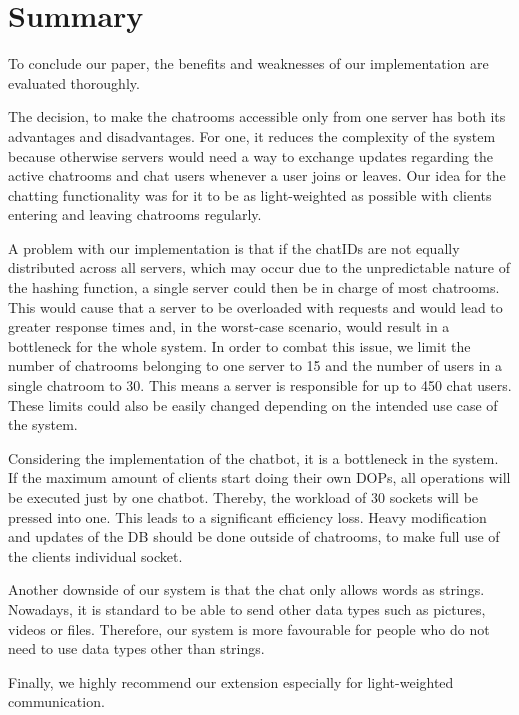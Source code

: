 \section{Summary}
\label{sec:summary}


To conclude our paper, the benefits and weaknesses of our implementation are evaluated thoroughly.

The decision, to make the chatrooms accessible only from one server has both its advantages and disadvantages. For one, it reduces the complexity of the system because otherwise servers would need a way to exchange updates regarding the active chatrooms and chat users whenever a user joins or leaves. Our idea for the chatting functionality was for it to be as light-weighted as possible with clients entering and leaving chatrooms regularly.

A problem with our implementation is that if the chatIDs are not equally distributed across all servers, which may occur due to the unpredictable nature of the hashing function, a single server could then be in charge of most chatrooms. This would cause that a server to be overloaded with requests and would lead to greater response times and, in the worst-case scenario, would result in a bottleneck for the whole system. In order to combat this issue, we limit the number of chatrooms belonging to one server to 15 and the number of users in a single chatroom to 30. This means a server is responsible for up to 450 chat users. These limits could also be easily changed depending on the intended use case of the system.

Considering the implementation of the chatbot, it is a bottleneck in the system. If the maximum amount of clients start doing their own DOPs, all operations will be executed just by one chatbot. Thereby, the workload of 30 sockets will be pressed into one. This leads to a significant efficiency loss. Heavy modification and updates of the DB should be done outside of chatrooms, to make full use of the clients individual socket.

Another downside of our system is that the chat only allows words as strings. Nowadays, it is standard to be able to send other data types such as pictures, videos or files. Therefore, our system is more favourable for people who do not need to use data types other than strings.

Finally, we highly recommend our extension especially for light-weighted communication.